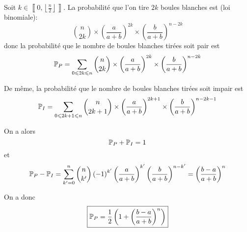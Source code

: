\begin{solution}
    Soit $k\in\left\llbracket0,\left\lfloor\frac{n}{2}\right\rfloor\right\rrbracket$. La probabilité que l'on tire $2k$ boules blanches est (loi binomiale):
    \begin{equation}
        \binom{n}{2k}\times\left(\frac{a}{a+b}\right)^{2k}\times\left(\frac{b}{a+b}\right)^{n-2k}
    \end{equation}
    donc la probabilité que le nombre de boules blanches tirées soit pair est 
    \begin{equation}
        \P_{P}=\sum_{0\leqslant 2k\leqslant n}\binom{n}{2k}\times\left(\frac{a}{a+b}\right)^{2k}\times\left(\frac{b}{a+b}\right)^{n-2k}
    \end{equation}
    
    De même, la probabilité que le nombre de boules blanches tirées soit impair est 
    \begin{equation}
        \P_{I}=\sum_{0\leqslant 2k+1\leqslant n}\binom{n}{2k+1}\times\left(\frac{a}{a+b}\right)^{2k+1}\times\left(\frac{b}{a+b}\right)^{n-2k-1}
    \end{equation}

    On a alors 
    \begin{equation}
        \P_{P}+\P_{I}=1
    \end{equation}
    et 
    \begin{equation}
        \P_{P}-\P_{I}=\sum_{k'=0}^{n}\binom{n}{k'}\left(-1\right)^{k'}\left(\frac{a}{a+b}\right)^{k'}\left(\frac{b}{a+b}\right)^{n-k'}=\left(\frac{b-a}{a+b}\right)^{n}
    \end{equation}

    On a donc 
    \begin{equation}
        \boxed{\P_{P}=\frac{1}{2}\left(1+\left(\frac{b-a}{a+b}\right)^{n}\right)}
    \end{equation}
\end{solution}

